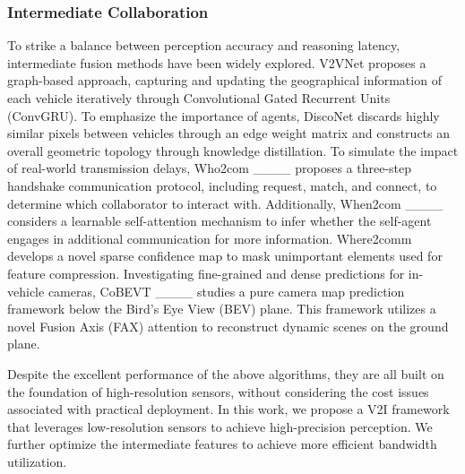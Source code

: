 \subsubsection{Intermediate Collaboration}
To strike a balance between perception accuracy and reasoning latency, intermediate fusion methods have been widely explored. V2VNet proposes a graph-based approach, capturing and updating the geographical information of each vehicle iteratively through Convolutional Gated Recurrent Units (ConvGRU). To emphasize the importance of agents, DiscoNet discards highly similar pixels between vehicles through an edge weight matrix and constructs an overall geometric topology through knowledge distillation. To simulate the impact of real-world transmission delays, Who2com ____ proposes a three-step handshake communication protocol, including request, match, and connect, to determine which collaborator to interact with. Additionally, When2com ____ considers a learnable self-attention mechanism to infer whether the self-agent engages in additional communication for more information. Where2comm develops a novel sparse confidence map to mask unimportant elements used for feature compression. Investigating fine-grained and dense predictions for in-vehicle cameras, CoBEVT ____ studies a pure camera map prediction framework below the Bird's Eye View (BEV) plane. This framework utilizes a novel Fusion Axis (FAX) attention to reconstruct dynamic scenes on the ground plane.

Despite the excellent performance of the above algorithms, they are all built on the foundation of high-resolution sensors, without considering the cost issues associated with practical deployment. In this work, we propose a V2I framework that leverages low-resolution sensors to achieve high-precision perception. We further optimize the intermediate features to achieve more efficient bandwidth utilization.



